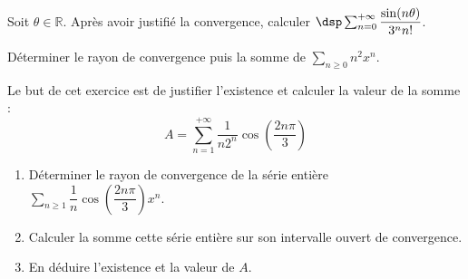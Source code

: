 \documentclass[a4paper,10pt]{report}
\newcommand{\Sum}[2]{\ensuremath{\textstyle{\sum\limits_{#1}^{#2}}}}
\begin{document}
\begin{Exercice}{} Soit $\theta\in\mathbb{R}$. Après avoir justifié la convergence, calculer $\dsp\sum_{n=0}^{+\infty}\dfrac{\sin(n\theta)}{3^nn!}$.
\end{Exercice}


\begin{Exercice}{} Déterminer le rayon de convergence puis la somme de $\Sum{n \geq 0}{} n^2x^n$.
\end{Exercice}

%
%

\begin{Exercice}{} Le but de cet exercice est de justifier l'existence et calculer la valeur de la somme :  
\[
A=\sum_{n=1}^{+\infty}\dfrac{1}{n2^n}\cos\left(\dfrac{2n\pi}{3}\right)
\]
\begin{enumerate}
\item Déterminer le rayon de convergence de la série entière $\Sum{n \geq 1}{} \dfrac{1}{n}\cos\left(\dfrac{2n\pi}{3}\right)x^n$.
\item Calculer la somme cette série entière sur son intervalle ouvert de convergence.
\item En déduire l'existence et la valeur de $A$.
\end{enumerate}
\end{Exercice}
\end{document}

